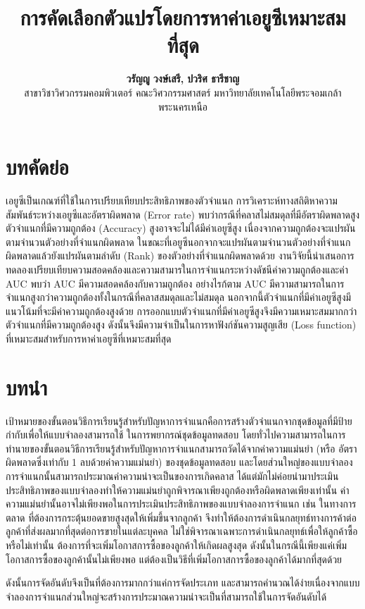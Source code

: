 \documentclass[twoside, twocolumn, 12pt]{article}
\title{\textbf{การคัดเลือกตัวแปรโดยการหาค่าเอยูซีเหมาะสมที่สุด}}
\author{%
\textbf{วรัญญู วงษ์เสรี, ปวริศ ธารีชาญ}\\[1ex]
 สาขาวิชาวิศวกรรมคอมพิวเตอร์ คณะวิศวกรรมศาสตร์ มหาวิทยาลัยเทคโนโลยีพระจอมเกล้าพระนครเหนือ %
}
\date{}
\begin{document}
\maketitle
\section*{บทคัดย่อ}
\quad เอยูซีเป็นเกณฑ์ที่ใช้ในการเปรียบเทียบประสิทธิภาพของตัวจำแนก การวิเคราะห์ทางสถิติหาความสัมพันธ์ระหว่างเอยูซีและอัตราผิดพลาด (Error rate) พบว่ากรณีที่คลาสไม่สมดุลที่มีอัตราผิดพลาดสูง ตัวจำแนกที่มีความถูกต้อง (Accuracy) สูงอาจจะไม่ได้มีค่าเอยูซีสูง เนื่องจากความถูกต้องจะแปรผันตามจำนวนตัวอย่างที่จำแนกผิดพลาด ในขณะที่เอยูซีนอกจากจะแปรผันตามจำนวนตัวอย่างที่จำแนกผิดพลาดแล้วยังแปรผันตามลำดับ (Rank) ของตัวอย่างที่จำแนกผิดพลาดด้วย งานวิจัยนี้นำเสนอการทดลองเปรียบเทียบความสอดคล้องและความสามารในการจำแนกระหว่างดัชนีค่าความถูกต้องและค่า AUC พบว่า AUC มีความสอดคล้องกับความถูกต้อง อย่างไรก้ตาม AUC มีความสามารถในการจำแนกสูงกว่าความถูกต้องทั้งในกรณีที่คลาสสมดุลและไม่สมดุล นอกจากนี้ตัวจำแนกที่มีค่าเอยูซีสูงมีแนวโน้มที่จะมีค่าความถูกต้องสูงด้วย การออกแบบตัวจำแนกที่มีค่าเอยูซีสูงจึงมีความเหมาะสมมากกว่าตัวจำแนกที่มีความถูกต้องสูง ดังนั้นจึงมีความจำเป็นในการหาฟังก์ชันความสูญเสีย (Loss function) ที่เหมาะสมสำหรับการหาค่าเอยูซีที่เหมาะสมที่สุด
\section{บทนำ}
เป้าหมายของขั้นตอนวิธีการเรียนรู้สำหรับปัญหาการจำแนกคือการสร้างตัวจำแนกจากชุดข้อมูลที่มีป้ายกำกับเพื่อให้แบบจำลองสามารถใช้ ในการพยากรณ์ชุดข้อมูลทดสอบ โดยทั่วไปความสามารถในการทำนายของขั้นตอนวิธีการเรียนรู้สำหรับปัญหาการจำแนกสามารถวัดได้จากค่าความแม่นยำ (หรือ อัตราผิดพลาดซึ่งเท่ากับ 1 ลบด้วยค่าความแม่นยำ) ของชุดข้อมูลทดสอบ และโดยส่วนใหญ่ของแบบจำลองการจำแนกนั้นสามารถประมาณค่าความน่าจะเป็นของการเกิดคลาส ได้แต่มักไม่ค่อยนำมาประเมินประสิทธิภาพของแบบจำลองทำให้ความแม่นยำถูกพิจารณาเพียงถูกต้องหรือผิดพลาดเพียงเท่านั้น 
ค่าความแม่นยำนั้นอาจไม่เพียงพอในการประเมินประสิทธิภาพของแบบจำลองการจำแนก เช่น ในทางการตลาด ที่ต้องการกระตุ้นยอดขายสูงสุดให้เพิ่มขึ้นจากลูกค้า จึงทำให้ต้องการดําเนินกลยุทธ์ทางการค้าต่อลูกค้าที่ส่งผลมากที่สุดต่อการขายในแต่ละบุคคล ไม่ใช่พิจารณาเฉพาะการดำเนินกลยุทธ์เพื่อให้ลูกค้าซื้อหรือไม่เท่านั้น ต้องการที่จะเพิ่มโอกาสการซื้อของลูกค้าให้เกิดผลสูงสุด ดังนั้นในกรณีนี้เพียงแค่เพิ่มโอกาสการซื้อของลูกค้านั้นไม่เพียงพอ แต่ต้องเป็นวิธีที่เพิ่มโอกาสการซื้อของลูกค้าได้มากที่สุดด้วย\cite{1}

ดังนั้นการจัดอันดับจึงเป็นที่ต้องการมากกว่าแค่การจัดประเภท และสามารถคำนวณได้ง่ายเนื่องจากแบบจำลองการจำแนกส่วนใหญ่จะสร้างการประมาณความน่าจะเป็นที่สามารถใช้ในการจัดอันดับได้
\end{document}
